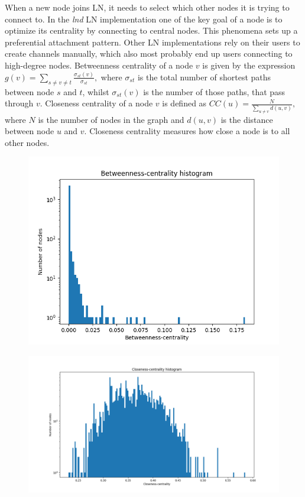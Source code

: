 \documentclass[a4paper]{article}
\theoremstyle{definition}
\begin{document}
When a new node joins LN, it needs to select which other nodes it is trying to connect to. In the \textit{lnd} LN implementation one of the key goal of a node is to optimize its centrality by connecting to central nodes. This phenomena sets up a preferential attachment pattern. Other LN implementations rely on their users to create channels manually, which also most probably end up users connecting to high-degree nodes. Betweenness centrality of a node $v$ is given by the expression $g(v)=\sum_{s\neq v \neq t}\frac{\sigma_{st}(v)}{\sigma_{st}},$ where $\sigma_{st}$ is the total number of shortest paths between node $s$ and $t$, whilst $\sigma_{st}(v)$ is the number of those paths, that pass through $v$. Closeness centrality  of a node $v$ is defined as $CC(u)=\frac{N}{\sum_{u\neq v}d(u,v)},$ where $N$ is the number of nodes in the graph and $d(u,v)$ is the distance between node $u$ and $v$.  Closeness centrality measures how close a node is to all other nodes. 

\begin{figure}[h]
	\centering
	\begin{minipage}{.6\textwidth}
		\centering
		\includegraphics[width=\linewidth]{betweennessCentrality.png}
		\label{fig:betweennescentrality}
	\end{minipage}%
	\begin{minipage}{.6\textwidth}
		\centering
		\includegraphics[width=\linewidth]{closenessCentrality.png}
		\label{fig:closenesscentrality}
	\end{minipage}
\end{figure}
\end{document}
